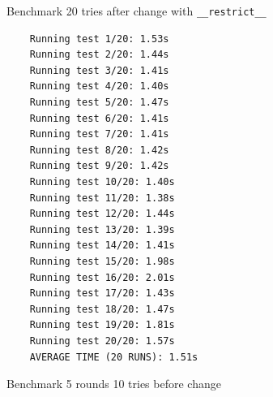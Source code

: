 Benchmark 20 tries after change with \verb|__restrict__|
\footnotesize\begin{verbatim}
    Running test 1/20: 1.53s
    Running test 2/20: 1.44s
    Running test 3/20: 1.41s
    Running test 4/20: 1.40s
    Running test 5/20: 1.47s
    Running test 6/20: 1.41s
    Running test 7/20: 1.41s
    Running test 8/20: 1.42s
    Running test 9/20: 1.42s
    Running test 10/20: 1.40s
    Running test 11/20: 1.38s
    Running test 12/20: 1.44s
    Running test 13/20: 1.39s
    Running test 14/20: 1.41s
    Running test 15/20: 1.98s
    Running test 16/20: 2.01s
    Running test 17/20: 1.43s
    Running test 18/20: 1.47s
    Running test 19/20: 1.81s
    Running test 20/20: 1.57s
    AVERAGE TIME (20 RUNS): 1.51s
\end{verbatim}
\normalsize

Benchmark 5 rounds 10 tries before change
